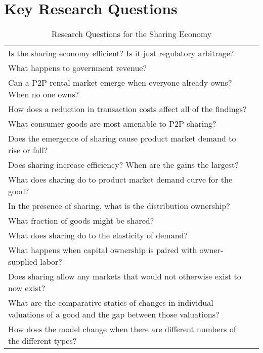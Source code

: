 \documentclass[11pt]{article}
\begin{document}




\section{Key Research Questions} 

\begin{table} 
\caption{Research Questions for the Sharing Economy} 
\begin{tabular}{ll} 
Is the sharing economy efficient? Is it just regulatory arbitrage? \\  
What happens to government revenue? \\ 
Can a P2P rental market emerge when everyone already owns? When no one owns? \\ 
How does a reduction in transaction costs affect all of the findings? \\ 
What consumer goods are most amenable to P2P sharing? \\ 
Does the emergence of sharing cause product market demand to rise or fall? \\ 
Does sharing increase efficiency? When are the gains the largest? \\ 
What does sharing do to product market demand curve for the good?\\  
In the presence of sharing, what is the distribution ownership? \\ 
What fraction of goods might be shared? \\
What does sharing do to the elasticity of demand?\\  
What happens when capital ownership is paired with owner-supplied labor? \\ 
Does sharing allow any markets that would not otherwise exist to now exist? \\ 
What are the comparative statics of changes in individual valuations of a good and the gap between those valuations?\\ 
How does the model change when there are different numbers of the different types? \\
\end{tabular} 
\end{table} 
\end{document}
